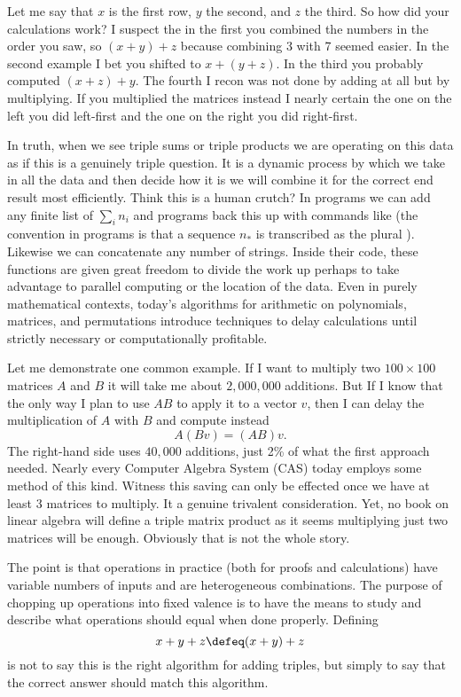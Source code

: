 Let me say that $x$ is the first row, 
$y$ the second, and $z$ the third.  So how did your calculations 
work?  I suspect the in the first you combined the numbers in the 
order you saw, so $(x+y)+z$ because combining 3 with 7 seemed easier.
In the second example I bet you shifted to $x+(y+z)$.  In the third 
you probably computed $(x+z)+y$.  The fourth I recon was not done by 
adding at all but by multiplying.  If you multiplied the matrices 
instead I nearly certain the one on the left you did left-first and 
the one on the right you did right-first.  

In truth, when we see triple sums or triple products we are operating 
on this data as if this is a genuinely triple question.  It is a dynamic process
by which we take in all the data and then decide how it is we will combine it
for the correct end result most efficiently.   Think this is a human crutch?
In programs we can add any finite list of $\sum_{i} n_i$ and 
programs back this up with commands like  
(the convention in programs is that a sequence $n_*$ is transcribed as 
the plural ).  Likewise we can concatenate any 
number of strings.  Inside their code, these functions are given great freedom 
to divide the work up perhaps to take advantage to parallel computing 
or the location of the data.  Even in purely mathematical contexts,
today's algorithms for arithmetic on polynomials, matrices, and 
permutations introduce techniques to delay calculations until strictly 
necessary or computationally profitable. 

Let me demonstrate one common example. 
If I want to multiply two $100\times 100$ matrices $A$ and $B$ it 
will take me about $2,000,000$ additions. But If I know that 
the only way I plan to use $AB$ to apply it to a vector $v$,
then I can delay the multiplication of $A$ with $B$ and compute instead
\[
    A(Bv) = (AB)v.
\]
The right-hand side uses $40,000$ additions, just 2\% of what the 
first approach needed.  Nearly every Computer Algebra System (CAS) today 
employs some method of this kind.  
Witness this saving can only be effected once we have at least 3 matrices
to multiply.  It a genuine trivalent consideration.  Yet, no book
on linear algebra will define a triple matrix product as it seems 
multiplying just two matrices will be enough.  Obviously that is not the whole story.



The point is that operations in practice (both for proofs and calculations)
have variable numbers of inputs and are heterogeneous combinations.  
The purpose of chopping up operations into fixed valence is to have the means 
to study and describe what operations should equal when done properly. 
Defining 
\[ 
    x+y+z \defeq (x+y)+z
\] 
is not to say this is the right algorithm for adding triples, but simply to 
say that the correct answer should match this algorithm.



